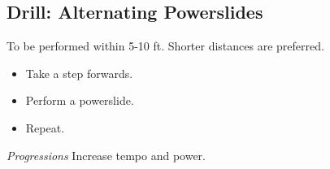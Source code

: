 \subsection*{Drill: Alternating Powerslides}
\label{drill:footwork/alternating_powerslides}

To be performed within 5-10 ft. Shorter distances are preferred.

\begin{itemize}
\item Take a step forwards.
\item Perform a powerslide.
\item Repeat.
\end{itemize}

{\it Progressions}
Increase tempo and power.

